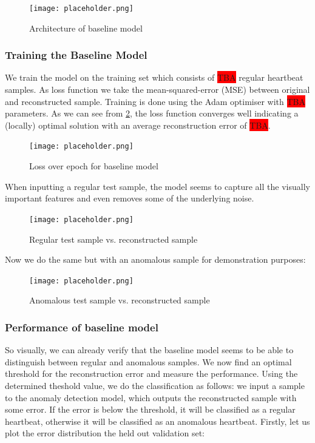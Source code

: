 \begin{figure}[h]
    \centering
    \texttt{[image: placeholder.png]}
    \caption{Architecture of baseline model}
    \label{fig:arch_baseline}
\end{figure}

\subsubsection*{Training the Baseline Model}
We train the model on the training set which consists of \colorbox{red}{TBA} regular heartbeat samples. As loss function we take the mean-squared-error (MSE) between original and reconstructed sample. Training is done using the Adam optimiser with \colorbox{red}{TBA} parameters. As we can see from \cref{fig:loss_baseline}, the loss function converges well indicating a (locally) optimal solution with an average reconstruction error of \colorbox{red}{TBA}. 

\begin{figure}[h]
    \centering
    \texttt{[image: placeholder.png]}
    \caption{Loss over epoch for baseline model}
    \label{fig:loss_baseline}
\end{figure}

When inputting a regular test sample, the model seems to capture all the visually important features and even removes some of the underlying noise.

\begin{figure}[h]
    \centering
    \texttt{[image: placeholder.png]}
    \caption{Regular test sample vs. reconstructed sample}
    \label{fig:regog_vs_recon}
\end{figure}

Now we do the same but with an anomalous sample for demonstration purposes:

\begin{figure}[h]
    \centering
    \texttt{[image: placeholder.png]}
    \caption{Anomalous test sample vs. reconstructed sample}
    \label{fig:anomog_vs_recon}
\end{figure}

\subsubsection*{Performance of baseline model}
So visually, we can already verify that the baseline model seems to be able to distinguish between regular and anomalous samples. We now find an optimal threshold for the reconstruction error and measure the performance. Using the determined theshold value, we do the classification as follows: we input a sample to the anomaly detection model, which outputs the reconstructed sample with some error. If the error is below the threshold, it will be classified as a regular heartbeat, otherwise it will be classified as an anomalous heartbeat. Firstly, let us plot the error distribution the held out validation set:

